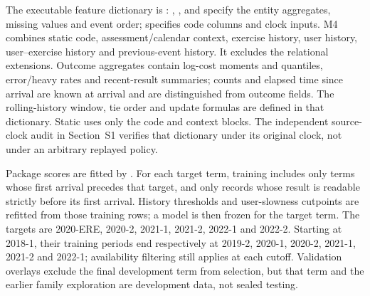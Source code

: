 \documentclass[mathematics,supfile,submit,moreauthors]{Definitions/mdpi}
\newcommand{\devnum}[1]{#1}
\begin{document}
The executable feature dictionary is :
, ,  and
 specify the entity aggregates, missing values and event
order;  specifies code columns and clock inputs.
M4 combines static code, assessment/calendar context, exercise history, user history,
user--exercise history and previous-event history. It excludes the relational
extensions. Outcome aggregates contain log-cost moments and quantiles, error/heavy
rates and recent-result summaries; counts and elapsed time since arrival are known
at arrival and are distinguished from outcome fields. The rolling-history window,
tie order and update formulas are defined in that dictionary. Static uses only the
code and context blocks. The independent source-clock audit in Section~S1 verifies
that dictionary under its original clock, not under an arbitrary replayed policy.

Package scores are fitted by . For each
target term, training includes only terms whose first arrival precedes that target,
and only records whose result is readable strictly before its first arrival.
History thresholds and user-slowness cutpoints are refitted from those training
rows; a model is then frozen for the target term. The targets are
\devnum{2020-ERE}, \devnum{2020-2}, \devnum{2021-1}, \devnum{2021-2},
\devnum{2022-1} and \devnum{2022-2}. Starting at \devnum{2018-1}, their training
periods end respectively at \devnum{2019-2}, \devnum{2020-1}, \devnum{2020-2},
\devnum{2021-1}, \devnum{2021-2} and \devnum{2022-1}; availability filtering still
applies at each cutoff. Validation overlays exclude the final development term
from selection, but that term and the earlier family exploration are development
data, not sealed testing.
\end{document}
